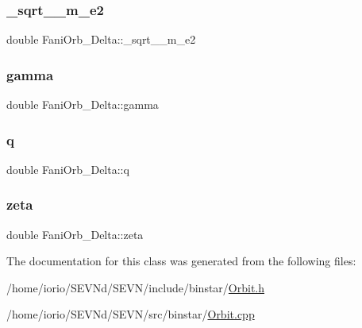 \subsubsection{\texorpdfstring{\+\_\+sqrt\+\_\+\_\+m\+\_\+e2}{\_sqrt\_1\_m\_e2}}
{\footnotesize\ttfamily double Fani\+Orb\+\_\+\+Delta\+::\+\_\+sqrt\+\_\+\_\+m\+\_\+e2\hspace{0.3cm}{\ttfamily [private]}}

\mbox{\label{class_fani_orb___delta_a7d6d54645ba51c9b8ad22c456d93dd9f}} 
\subsubsection{\texorpdfstring{gamma}{gamma}}
{\footnotesize\ttfamily double Fani\+Orb\+\_\+\+Delta\+::gamma\hspace{0.3cm}{\ttfamily [private]}}

\mbox{\label{class_fani_orb___delta_a2371cae5b3926e9320b6a566ae7475e1}} 
\subsubsection{\texorpdfstring{q}{q}}
{\footnotesize\ttfamily double Fani\+Orb\+\_\+\+Delta\+::q\hspace{0.3cm}{\ttfamily [private]}}

\mbox{\label{class_fani_orb___delta_abedf4a744d0de675f0ee6e64806f46ee}} 
\subsubsection{\texorpdfstring{zeta}{zeta}}
{\footnotesize\ttfamily double Fani\+Orb\+\_\+\+Delta\+::zeta\hspace{0.3cm}{\ttfamily [private]}}



The documentation for this class was generated from the following files\+:\begin{DoxyCompactItemize}
\item 
/home/iorio/\+S\+E\+V\+Nd/\+S\+E\+V\+N/include/binstar/\hyperlink{_orbit_8h}{Orbit.\+h}\item 
/home/iorio/\+S\+E\+V\+Nd/\+S\+E\+V\+N/src/binstar/\hyperlink{_orbit_8cpp}{Orbit.\+cpp}\end{DoxyCompactItemize}
